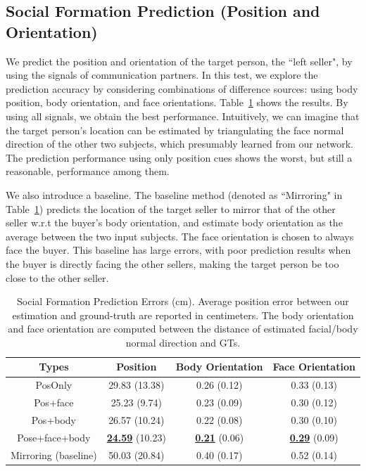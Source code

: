 \subsection{Social Formation Prediction (Position and Orientation)}
We predict the position and orientation of the target person, the ``left seller", by using the signals of communication partners. In this test, we explore the prediction accuracy by considering combinations of difference sources: using body position, body orientation, and face orientations. Table~\ref{table:predForm_errors} shows the results. By using all signals, we obtain the best performance. Intuitively, we can imagine that the target person's location can be estimated by triangulating the face normal direction of the other two subjects, which presumably learned from our network. The prediction performance using only position cues shows the worst, but still a reasonable, performance among them. 

We also introduce a baseline. The baseline method (denoted as ``Mirroring" in Table~\ref{table:predForm_errors}) predicts the location of the target seller to mirror that of the other seller w.r.t the buyer's body orientation, and estimate body orientation as the average between the two input subjects. The face orientation is chosen to always face the buyer. This baseline has large errors, with poor prediction results when the buyer is directly facing the other sellers, making the target person be too close to the other seller. 



\begin{table}[t]
	\centering
	\begin{tabular}{c| c| c| c}
		\hline
		Types & Position & Body Orientation & Face Orientation\\
		\hline
		PosOnly & 29.83 (13.38) & 0.26 (0.12) & 0.33 (0.13) \\
		\hline
		Pos+face & 25.23 (9.74) & 0.23 (0.09) & 0.30 (0.12) \\
		\hline
		Pos+body & 26.57 (10.24) & 0.22 (0.08) & 0.30 (0.10) \\
		\hline
		Pose+face+body & \underline {\textbf{24.59}} (10.23) &  \underline {\textbf{0.21}} (0.06) &  \underline {\textbf{0.29}} (0.09) \\
		\hline
		Mirroring (baseline) &  50.03 (20.84) & 0.40 (0.17) & 0.52 (0.14) \\
		\hline
	\end{tabular}
	\caption{Social Formation Prediction Errors (cm). Average position error between our estimation and ground-truth are reported in centimeters. The body orientation and face orientation are computed between the distance of estimated facial/body normal direction and GTs.\label{table:predForm_errors}}
\end{table}


